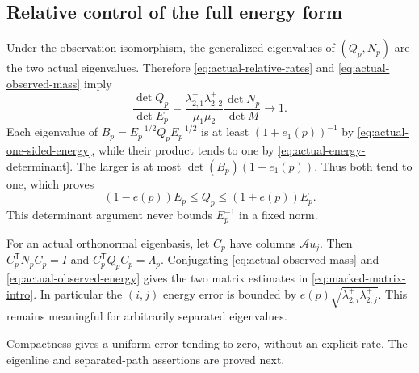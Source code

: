 \subsection{Relative control of the full energy form}

Under the observation isomorphism, the
generalized eigenvalues of $(Q_p,N_p)$
are the two actual eigenvalues. Therefore
\eqref{eq:actual-relative-rates} and
\eqref{eq:actual-observed-mass} imply
\begin{equation}\label{eq:actual-energy-determinant}
 \frac{\det Q_p}{\det E_p}
  =\frac{\lambda_{2,1}^+\lambda_{2,2}^+}{\mu_1\mu_2}
                       \frac{\det N_p}{\det M}
       \longrightarrow1.
\end{equation}
Each eigenvalue of
$B_p=E_p^{-1/2}Q_pE_p^{-1/2}$ is at least
$(1+e_1(p))^{-1}$ by
\eqref{eq:actual-one-sided-energy},
while their product tends to one by
\eqref{eq:actual-energy-determinant}.
The larger is at most
$\det(B_p)(1+e_1(p))$. Thus both tend to one,
which proves
\begin{equation}\label{eq:actual-observed-energy}
 (1-e(p))E_p\le Q_p\le(1+e(p))E_p.
\end{equation}
This determinant argument never bounds
$E_p^{-1}$ in a fixed norm.

For an actual orthonormal eigenbasis,
let $C_p$ have columns $\mathcal Au_j$.
Then
$C_p^{\mathsf T}N_pC_p=I$ and
$C_p^{\mathsf T}Q_pC_p=\Lambda_p$.
Conjugating \eqref{eq:actual-observed-mass}
and \eqref{eq:actual-observed-energy}
gives the two matrix estimates in
\eqref{eq:marked-matrix-intro}. In particular the
$(i,j)$ energy error is bounded by
$e(p)\sqrt{\lambda_{2,i}^+\lambda_{2,j}^+}$.
This remains meaningful for arbitrarily
separated eigenvalues.

Compactness gives a uniform error tending
to zero, without an explicit rate.
The eigenline and separated-path assertions
are proved next.
